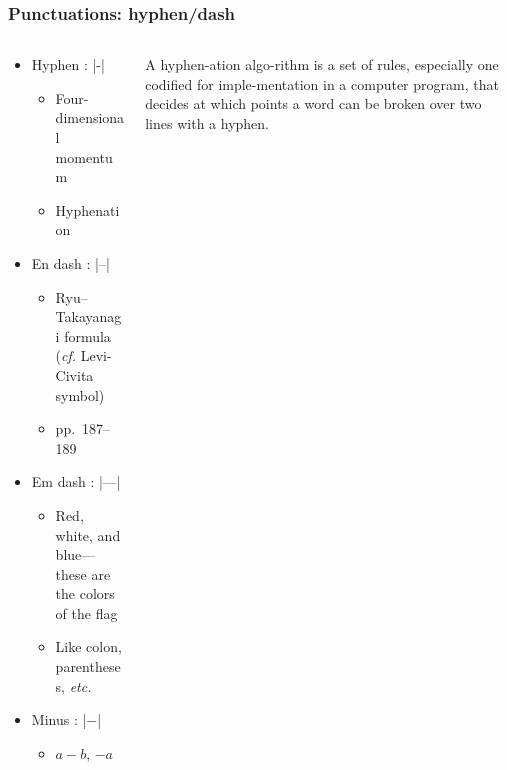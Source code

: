 \begin{frame}[fragile]
\frametitle{Punctuations: hyphen/dash}
\begin{columns}
\begin{column}{0.84\textwidth}
  \begin{itemize}
    \item<1-> Hyphen : |-|

      \begin{itemize}
        \item Four-dimensional momentum
        \item Hyphenation
      \end{itemize}

    \item<3-> En dash : |--|

      \begin{itemize}
        \item Ryu--Takayanagi formula (\emph{cf.} Levi-Civita symbol)
        \item pp.~187--189
      \end{itemize}

    \item<4-> Em dash : |---|

      \begin{itemize}
        \item Red, white, and blue---these are the colors of the flag
        \item Like colon, parentheses, \emph{etc.}
      \end{itemize}

    \item<5-> Minus : |$-$|

      \begin{itemize}
        \item $a-b$, $-a$
      \end{itemize}
  \end{itemize}
\end{column}
\begin{column}{0.13\textwidth}
  \tiny\RaggedRight
  A hyphen\alert{-}ation algo\alert{-}rithm is a set of rules, especially one codified
  for imple\alert{-}mentation in a computer program, that decides at which points
  a word can be broken over two lines with a hyphen.
\end{column}
\end{columns}
\end{frame}

